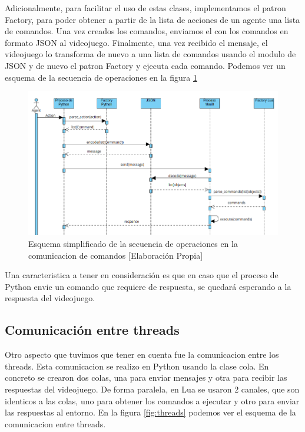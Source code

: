 Adicionalmente, para facilitar el uso de estas clases, implementamos el patron Factory, para poder obtener a partir de la lista de acciones de un agente una lista de comandos. Una vez creados los comandos, enviamos el con los comandos en formato JSON al videojuego. Finalmente, una vez recibido el mensaje, el videojuego lo transforma de nuevo a una lista de comandos usando el modulo de JSON y de nuevo el patron Factory y ejecuta cada comando. Podemos ver un esquema de la secuencia de operaciones en la figura \ref {fig:operations}

\begin{figure}[ht]
    \centering
    \includegraphics[width=1.0\textwidth]{img/secuencia_op.png}
    \caption{Esquema simplificado de la secuencia de operaciones en la comunicacion de comandos [Elaboración Propia]}
    \label{fig:operations}
\end{figure}

Una caracteristica a tener en consideración es que en caso que el proceso de Python envie un comando que requiere de respuesta, se quedará esperando a la respuesta del videojuego.

\subsection{Comunicación entre threads}

Otro aspecto que tuvimos que tener en cuenta fue la comunicacion entre los threads. Esta comunicacion se realizo en Python usando la clase cola. En concreto se crearon dos colas, una para enviar mensajes y otra para recibir las respuestas del videojuego. De forma paralela, en Lua se usaron 2 canales, que son identicos a las colas, uno para obtener los comandos a ejecutar y otro para enviar las respuestas al entorno. En la figura \ref {fig:threads} podemos ver el esquema de la comunicacion entre threads. 

